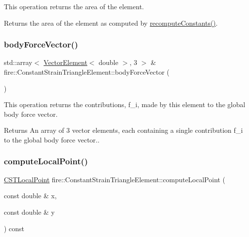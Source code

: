 This operation returns the area of the element. \begin{DoxyReturn}{Returns}
the area of the element as computed by \hyperlink{a00764_a40cf9432221b62db76e8b154e3e81e3d}{recompute\+Constants()}. 
\end{DoxyReturn}
\mbox{\label{a00764_ae0795172aa1ee5ffc68ec0e2c4aab9cc}} 
\subsubsection{\texorpdfstring{body\+Force\+Vector()}{bodyForceVector()}}
{\footnotesize\ttfamily std\+::array$<$ \hyperlink{a00189_a08f01d4bb892cf7b2386d0f3a8643d72}{Vector\+Element}$<$ double $>$, 3 $>$ \& fire\+::\+Constant\+Strain\+Triangle\+Element\+::body\+Force\+Vector (\begin{DoxyParamCaption}{ }\end{DoxyParamCaption})}

This operation returns the contributions, f\+\_\+i, made by this element to the global body force vector. \begin{DoxyReturn}{Returns}
An array of 3 vector elements, each containing a single contribution f\+\_\+i to the global body force vector.. 
\end{DoxyReturn}
\mbox{\label{a00764_a772e106e996b0d757332ca59b9c7f159}} 
\subsubsection{\texorpdfstring{compute\+Local\+Point()}{computeLocalPoint()}}
{\footnotesize\ttfamily \hyperlink{a00189_a124b14f4255dab47a3f7235a02cc65ee}{C\+S\+T\+Local\+Point} fire\+::\+Constant\+Strain\+Triangle\+Element\+::compute\+Local\+Point (\begin{DoxyParamCaption}\item[{const double \&}]{x,  }\item[{const double \&}]{y }\end{DoxyParamCaption}) const}

